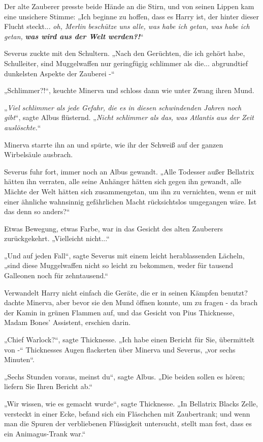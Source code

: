 {Der alte Zauberer presste beide Hände an die Stirn, und von seinen Lippen kam eine unsichere Stimme: „Ich beginne zu hoffen, dass es Harry ist, der hinter dieser Flucht steckt... \emph{oh, Merlin beschütze uns alle, was habe ich getan, was habe ich getan,} \textbf{\emph{was wird aus der Welt werden?!}}“

Severus zuckte mit den Schultern. „Nach den Gerüchten, die ich gehört habe, Schulleiter, sind Muggelwaffen nur geringfügig schlimmer als die... abgrundtief dunkelsten Aspekte der Zauberei -“

„Schlimmer?!“, keuchte Minerva und schloss dann wie unter Zwang ihren Mund.

„\emph{Viel} \emph{schlimmer als jede Gefahr, die es in diesen schwindenden Jahren noch gibt}“, sagte Albus flüsternd. „\emph{Nicht schlimmer als das, was Atlantis aus der Zeit auslöschte.}“

Minerva starrte ihn an und spürte, wie ihr der Schweiß auf der ganzen Wirbelsäule ausbrach.

Severus fuhr fort, immer noch an Albus gewandt. „Alle Todesser außer Bellatrix hätten ihn verraten, alle seine Anhänger hätten sich gegen ihn gewandt, alle Mächte der Welt hätten sich zusammengetan, um ihn zu vernichten, wenn er mit einer ähnliche wahnsinnig gefährlichen Macht rücksichtslos umgegangen wäre. Ist das denn so anders?“

Etwas Bewegung, etwas Farbe, war in das Gesicht des alten Zauberers zurückgekehrt. „Vielleicht nicht...“

„Und auf jeden Fall“, sagte Severus mit einem leicht herablassenden Lächeln, „sind diese Muggelwaffen nicht so leicht zu bekommen, weder für tausend Galleonen noch für zehntausend.“

Verwandelt Harry nicht einfach die Geräte, die er in seinen Kämpfen benutzt? dachte Minerva, aber bevor sie den Mund öffnen konnte, um zu fragen - da brach der Kamin in grünen Flammen auf, und das Gesicht von Pius Thicknesse, Madam Bones' Assistent, erschien darin.

„Chief Warlock?“, sagte Thicknesse. „Ich habe einen Bericht für Sie, übermittelt von -“ Thicknesses Augen flackerten über Minerva und Severus, „vor sechs Minuten“.

„Sechs Stunden voraus, meinst du“, sagte Albus. „Die beiden sollen es hören; liefern Sie Ihren Bericht ab.“

„Wir wissen, wie es gemacht wurde“, sagte Thicknesse. „In Bellatrix Blacks Zelle, versteckt in einer Ecke, befand sich ein Fläschchen mit Zaubertrank; und wenn man die Spuren der verbliebenen Flüssigkeit untersucht, stellt man fest, dass es ein Animagus-Trank war.“

}
